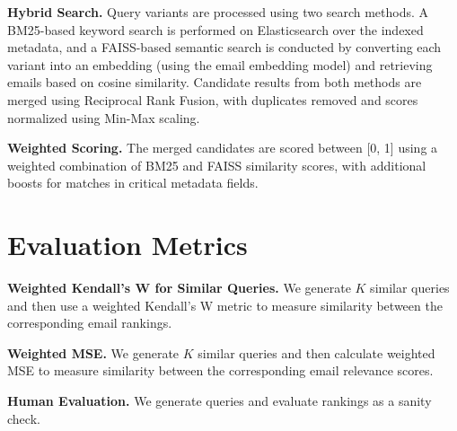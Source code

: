 \documentclass{article}
\begin{document}
\textbf{Hybrid Search.} Query variants are processed using two search methods. A BM25-based keyword search is performed on Elasticsearch over the indexed metadata, and a FAISS-based semantic search is conducted by converting each variant into an embedding (using the email embedding model) and retrieving emails based on cosine similarity. Candidate results from both methods are merged using Reciprocal Rank Fusion, with duplicates removed and scores normalized using Min-Max scaling.

\textbf{Weighted Scoring. } The merged candidates are scored between [0, 1] using a weighted combination of BM25 and FAISS similarity scores, with additional boosts for matches in critical metadata fields.


\section{Evaluation Metrics}
\label{metrics}

\textbf{Weighted Kendall’s W for Similar Queries. } We generate $K$ similar queries and then use a weighted Kendall's W metric to measure similarity between the corresponding email rankings. 

\textbf{Weighted MSE. } We generate $K$ similar queries and then calculate weighted MSE to measure similarity between the corresponding email relevance scores. 

\textbf{Human Evaluation. } We generate queries and evaluate rankings as a sanity check.

 

\newpage




\end{document}
